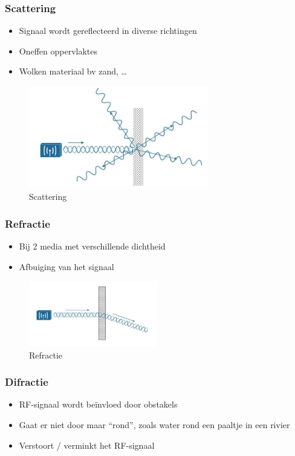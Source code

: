\documentclass{article}
\begin{document}
\subsubsection{Scattering}
\begin{itemize}
    \item Signaal wordt gereflecteerd in diverse richtingen
    \item Oneffen oppervlaktes
    \item Wolken materiaal bv zand, \dots
\end{itemize}

\begin{figure}[H]
    \centering
    \includegraphics[width=0.7\textwidth]{Screenshot_20200309_124533.png}
    \caption{Scattering}
\end{figure}

\subsubsection{Refractie}
\begin{itemize}
    \item Bij 2 media met verschillende dichtheid
    \item Afbuiging van het signaal
\end{itemize}

\begin{figure}[H]
    \centering
    \includegraphics[width=0.5\textwidth]{Screenshot_20200309_124610.png}
    \caption{Refractie}
\end{figure}

\subsubsection{Difractie}
\begin{itemize}
    \item RF-signaal wordt beïnvloed door obstakels
    \item Gaat er niet door maar “rond”, zoals water rond een paaltje in een rivier
    \item Verstoort / verminkt het RF-signaal
\end{itemize}
\end{document}
